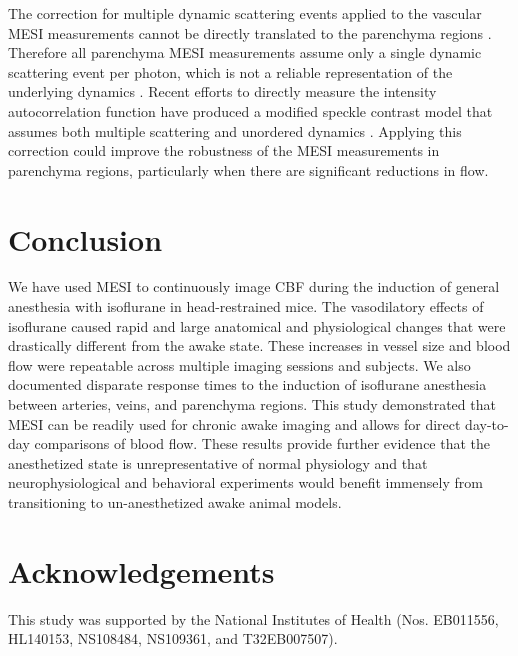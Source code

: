 \documentclass[review]{elsarticle}
\begin{document}
The correction for multiple dynamic scattering events applied to the vascular MESI measurements cannot be directly translated to the parenchyma regions \cite{Kazmi:2015du}. Therefore all parenchyma MESI measurements assume only a single dynamic scattering event per photon, which is not a reliable representation of the underlying dynamics \cite{Davis:2015ij}. Recent efforts to directly measure the intensity autocorrelation function have produced a modified speckle contrast model that assumes both multiple scattering and unordered dynamics \cite{Postnov.2020}. Applying this correction could improve the robustness of the MESI measurements in parenchyma regions, particularly when there are significant reductions in flow.


\section{Conclusion}

We have used MESI to continuously image CBF during the induction of general anesthesia with isoflurane in head-restrained mice. The vasodilatory effects of isoflurane caused rapid and large anatomical and physiological changes that were drastically different from the awake state. These increases in vessel size and blood flow were repeatable across multiple imaging sessions and subjects. We also documented disparate response times to the induction of isoflurane anesthesia between arteries, veins, and parenchyma regions. This study demonstrated that MESI can be readily used for chronic awake imaging and allows for direct day-to-day comparisons of blood flow. These results provide further evidence that the anesthetized state is unrepresentative of normal physiology and that neurophysiological and behavioral experiments would benefit immensely from transitioning to un-anesthetized awake animal models.



\section*{Acknowledgements}
This study was supported by the National Institutes of Health (Nos. EB011556, HL140153, NS108484, NS109361, and T32EB007507).
\end{document}
